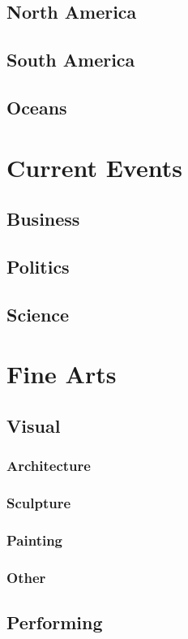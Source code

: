 \documentclass[12pt]{book}
\begin{document}
	\section{North America}
	\section{South America}
	\section{Oceans}





	
\chapter{Current Events}
		\section{Business}
		\section{Politics}
		\section{Science}
	
\chapter{Fine Arts}
	\section{Visual}
		\subsection{Architecture}
		\subsection{Sculpture}
		\subsection{Painting}
		\subsection{Other}
		
	\section{Performing}
\end{document}
